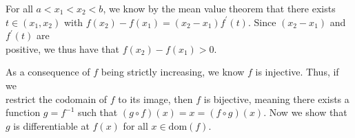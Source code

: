 \documentclass{book}
\newcommand{\pracTwo}{
   \color{Orange}%
   \fontsize{12}{14}\selectfont%
}
\newenvironment{myIndent}{%
   \begin{adjustwidth}{2.5em}{0em}%
}{%
   \end{adjustwidth}%
}
\newcommand{\domain}[1]{\mathrm{dom}(#1)}
\newcommand{\retTwo}{\hfill\bigbreak}
\begin{document}
{\begin{myIndent}\pracTwo
   For all $a < x_1 < x_2 < b$, we know by the mean value theorem that there exists\\ $t \in (x_1, x_2)$ with $f(x_2) - f(x_1) = (x_2 - x_1)f^\prime(t)$. Since $(x_2 - x_1)$ and $f^\prime(t)$ are\\ positive, we thus have that $f(x_2) - f(x_1) > 0$.\retTwo
\end{myIndent}}

As a consequence of $f$ being strictly increasing, we know $f$ is injective. Thus, if we\\ restrict the codomain of $f$ to its image, then $f$ is bijective, meaning there exists a\\ function $g = f^{-1}$ such that $(g \circ f)(x) = x = (f \circ g)(x)$. Now we show that\\ $g$ is differentiable at $f(x)$ for all $x \in \domain{f}$.
\end{document}
